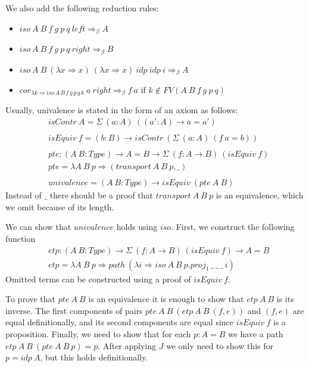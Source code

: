 \documentclass{amsart}
\theoremstyle{definition}
\theoremstyle{remark}
\newcommand{\red}{\Rightarrow}
\numberwithin{figure}{section}
\begin{document}
We also add the following reduction rules:
\begin{itemize}
\item $iso\ A\ B\ f\ g\ p\ q\ left \red_\beta A$
\item $iso\ A\ B\ f\ g\ p\ q\ right \red_\beta B$
\item $iso\ A\ B\ (\lambda x \red x)\ (\lambda x \red x)\ idp\ idp\ i \red_\beta A$
\item $coe_{\lambda k \red iso\,A\,B\,f\,g\,p\,q\,k}\ a\ right \red_\beta f\ a$ if $k \notin FV(A\ B\ f\ g\ p\ q)$
\end{itemize}

Usually, univalence is stated in the form of an axiom as follows:
\begin{align*}
& isContr\ A = \Sigma\ (a : A)\ ((a' : A) \to a = a') \\
& \\
& isEquiv\ f = (b : B) \to isContr\ (\Sigma\ (a : A)\ (f\ a = b)) \\
& \\
& pte : (A\ B : Type) \to A = B \to \Sigma\ (f : A \to B)\ (isEquiv\ f) \\
& pte = \lambda A\ B\ p \red (transport\ A\ B\ p, \_) \\
& \\
& univalence = (A\ B : Type) \to isEquiv\ (pte\ A\ B)
\end{align*}
Instead of $\_$ there should be a proof that $transport\ A\ B\ p$ is an equivalence, which we omit because of its length.

We can show that $univalence$ holds using $iso$.
First, we construct the following function
\begin{align*}
& etp : (A\ B : Type) \to \Sigma\ (f : A \to B)\ (isEquiv\ f) \to A = B \\
& etp = \lambda A\ B\ p \red path\ (\lambda i \red iso\ A\ B\ p.proj_1\ \_\ \_\ \_\ i)
\end{align*}
Omitted terms can be constructed using a proof of $isEquiv\ f$.

To prove that $pte\ A\ B$ is an equivalence it is enough to show that $etp\ A\ B$ is its inverse.
The first components of pairs $pte\ A\ B\ (etp\ A\ B\ (f, e))$ and $(f, e)$ are equal definitionally, and its second components are equal since $isEquiv\ f$ is a proposition.
Finally, we need to show that for each $p : A = B$ we have a path $etp\ A\ B\ (pte\ A\ B\ p) = p$.
After applying $J$ we only need to show this for $p = idp\ A$, but this holds definitionally.
\end{document}
